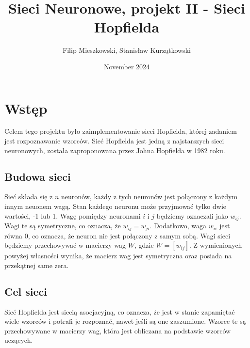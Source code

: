 \documentclass{article}
\title{Sieci Neuronowe, projekt II - Sieci Hopfielda}
\author{Filip Mieszkowski, Stanisław Kurzątkowski}
\date{November 2024}
\begin{document}
\maketitle

\section{Wstęp}
Celem tego projektu było zaimplementowanie sieci Hopfielda, której zadaniem jest rozpoznawanie wzorców. 
Sieć Hopfielda jest jedną z najstarszych sieci neuronowych, została zaproponowana przez Johna Hopfielda w 1982 roku. 

\subsection{Budowa sieci}
Sieć składa się z $n$ neuronów, każdy z tych neuronów jest połączony z każdym innym neuonem wagą. 
Stan każdego neuronu może przyjmować tylko dwie wartości, -1 lub 1.
Wagę pomiędzy neuronami $i$ i $j$ będziemy oznaczali jako $w_{ij}$.
Wagi te są symetryczne, co oznacza, że $w_{ij} = w_{ji}$. 
Dodatkowo, waga $w_{ii}$ jest równa 0, co oznacza, że neuron nie jest połączony z samym sobą.
Wagi sieci będziemy przechowywać w macierzy wag $W$, gdzie $W = [w_{ij}]$.
Z wymienionych powyżej własności wynika, że macierz wag jest symetryczna oraz posiada na przekątnej same zera.


\subsection{Cel sieci}
Sieć Hopfielda jest siecią asocjacyjną, co oznacza, że jest w stanie zapamiętać wiele wzorców i potrafi je rozpoznać, 
nawet jeśli są one zaszumione. Wzorce te są przechowywane w macierzy wag, która jest obliczana na podstawie wzorców uczących.


\section{}
 
\end{document}
